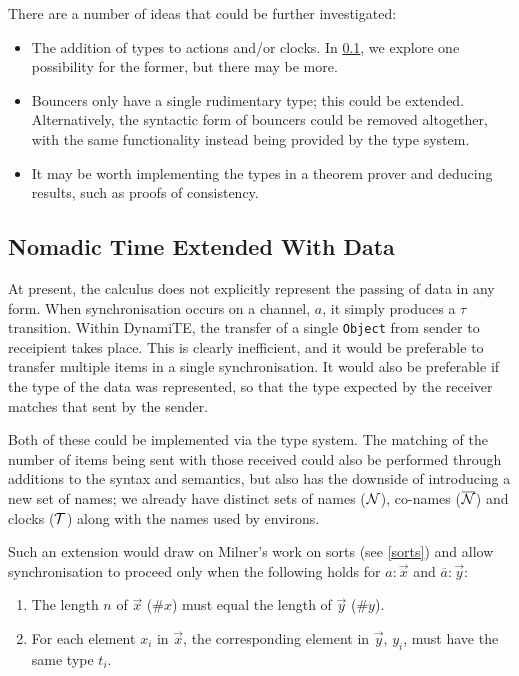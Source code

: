 There are a number of ideas that could be further investigated:

\begin{itemize}
\item The addition of types to actions and/or clocks.  In \ref{tnted},
  we explore one possibility for the former, but there may be more.
\item Bouncers only have a single rudimentary type; this could be
  extended.  Alternatively, the syntactic form of bouncers could be
  removed altogether, with the same functionality instead being
  provided by the type system.
\item It may be worth implementing the types in a theorem prover and
  deducing results, such as proofs of consistency.
\end{itemize}

\subsection{Nomadic Time Extended With Data}
\label{tnted}

At present, the calculus does not explicitly represent the passing of
data in any form.  When synchronisation occurs on a channel, $a$, it
simply produces a $\tau$ transition.  Within DynamiTE, the transfer of
a single \texttt{Object} from sender to receipient takes place.  This
is clearly inefficient, and it would be preferable to transfer
multiple items in a single synchronisation.  It would also be
preferable if the type of the data was represented, so that the type
expected by the receiver matches that sent by the sender.

Both of these could be implemented via the type system.  The matching
of the number of items being sent with those received could also be
performed through additions to the syntax and semantics, but also has
the downside of introducing a new set of names; we already have
distinct sets of names ($\text{$\mathcal{N}$}$), co-names ($\text{$\overline{\text{$\mathcal{N}$}}$}$) and clocks
($\text{$\mathcal{T}$}$) along with the names used by environs.

Such an extension would draw on Milner's work on sorts (see
\ref{sorts}) and allow synchronisation to proceed only when the
following holds for $a : \vec{x}$ and $\overline{a} : \vec{y}$:

\begin{enumerate}
\item The length $n$ of $\vec{x}$ ($\#x$) must equal the length of
  $\vec{y}$ ($\#y$).
\item For each element $x_i$ in $\vec{x}$, the corresponding element
  in $\vec{y}$, $y_i$, must have the same type $t_i$.
\end{enumerate}

